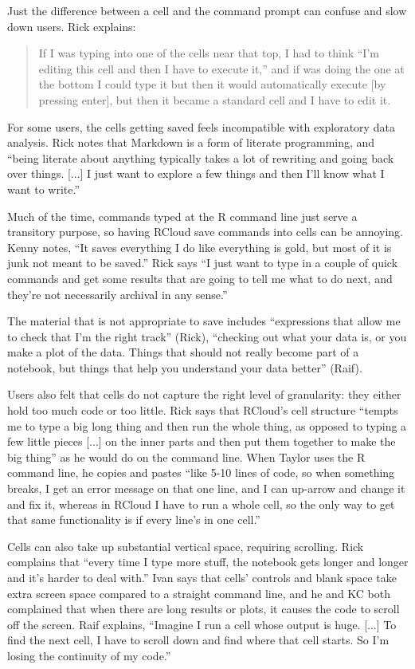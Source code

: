 Just the difference between a cell and the command prompt can confuse and slow
down users. Rick explains:
\begin{quote}
If I was typing into one of the cells near that top, I had
to think ``I'm editing this cell and then I have to execute it,'' and if was doing
the one at the bottom I could type it but then it would automatically execute
[by pressing enter], but then it became a standard cell and I have to edit
it.
\end{quote}

For some users, the cells getting saved feels incompatible with exploratory data
analysis. Rick notes that Markdown is a form of literate programming, and
``being literate about anything typically takes a lot of rewriting and going
back over things. [...] I just want to explore a few things and then I'll know
what I want to write.''

Much of the time, commands typed at the R command line just serve a transitory
purpose, so having RCloud save commands into cells can be annoying. Kenny notes, ``It saves everything I do like everything is gold, but most
of it is junk not meant to be saved.'' Rick says ``I just want to type in a
couple of quick commands and get some results that are going to tell
me what to do next, and they're not necessarily archival in any sense.''

The material that is not appropriate to save includes ``expressions that allow
me to check that I'm the right track'' (Rick), ``checking out what your data is,
or you make a plot of the data. Things that should not really become part of a
notebook, but things that help you understand your data better'' (Raif).

Users also felt that cells do not capture the right level of granularity: they
either hold too much code or too little. Rick says that RCloud's cell structure
``tempts me to type a big long thing and then run the whole thing, as opposed to
typing a few little pieces [...] on the inner parts and then put
them together to make the big thing'' as he would do on the command line. When
Taylor uses the R command line, he copies and pastes ``like 5-10 lines of code,
so when something breaks, I get an error message on that one line, and I can
up-arrow and change it and fix it, whereas in RCloud I have to run a whole cell,
so the only way to get that same functionality is if every line's in one
cell.''

Cells can also take up substantial vertical space, requiring scrolling. Rick
complains that ``every time I type more stuff, the notebook gets longer and
longer and it's harder to deal with.'' Ivan says that cells' controls and blank
space take extra screen space compared to a straight command line, and he and
KC both complained that when there are long results or plots, it causes the
code to scroll off the screen. Raif explains, ``Imagine I run a cell whose
output is huge. [...] To find the next cell, I have to scroll down and find
where that cell starts. So I'm losing the continuity of my code.''

